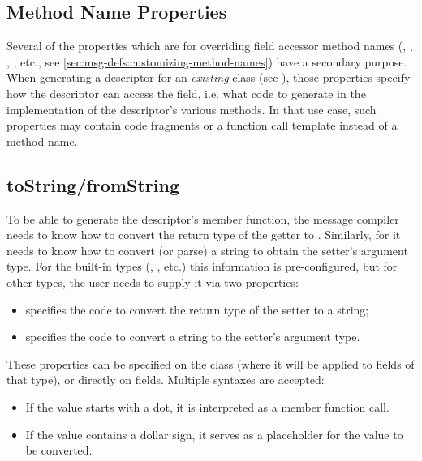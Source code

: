 \subsection{Method Name Properties}
\label{sec:msg-defs:descriptor-method-name-properties}

Several of the properties which are for overriding field accessor method names
(, , , ,
etc., see \ref{sec:msg-defs:customizing-method-names}) have a secondary purpose.
When generating a descriptor for an \textit{existing} class (see
), those properties specify how the descriptor can access
the field, i.e. what code to generate in the implementation of the descriptor's
various methods. In that use case, such properties may contain code fragments or
a function call template instead of a method name.


\subsection{toString/fromString}
\label{sec:msg-defs:descriptor-tostring}

To be able to generate the descriptor's  member
function, the message compiler needs to know how to convert the return type of
the getter to . Similarly, for 
it needs to know how to convert (or parse) a string to obtain the setter's
argument type. For the built-in types (, , etc.)
this information is pre-configured, but for other types, the user needs to
supply it via two properties:

\begin{itemize}
  \item {} specifies the code to convert the return type of the setter to a string;
  \item {} specifies the code to convert a string to the setter's argument type.
\end{itemize}

These properties can be specified on the class (where it will be applied to
fields of that type), or directly on fields. Multiple syntaxes are accepted:

\begin{itemize}
  \item If the value starts with a dot, it is interpreted as a member function call.
  \item If the value contains a dollar sign, it serves as a placeholder for the value to be converted.
\end{itemize}

